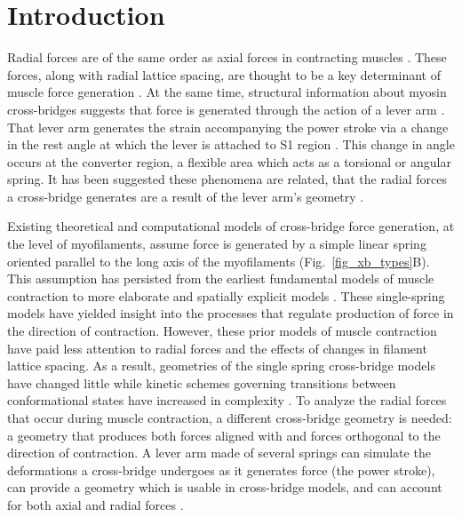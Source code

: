\documentclass[]{article}
\begin{document}

\section*{Introduction} %

Radial forces are of the same order as axial forces in contracting muscles \citep{Cecchi1990, Millman1998}. 
These forces, along with radial lattice spacing, are thought to be a key determinant of muscle force generation \citep{Fuchs2005}. 
At the same time, structural information about myosin cross-bridges suggests that force is generated through the action of a lever arm \citep{Rayment1993, Uyeda1996, Huxley2000}.
That lever arm generates the strain accompanying the power stroke via a change in the rest angle at which the lever is attached to S1 region \citep{Huxley2000, Houdusse2001}. 
This change in angle occurs at the converter region, a flexible area which acts as a torsional or angular spring. 
It has been suggested these phenomena are related, that the radial forces a cross-bridge generates are a result of the lever arm's geometry \citep{Schoenberg1980b}. 

Existing theoretical and computational models of cross-bridge force generation, at the level of myofilaments, assume force is generated by a simple linear spring oriented parallel to the long axis of the myofilaments (Fig.~\ref{fig_xb_types}B).  %
This assumption has persisted from the earliest fundamental models of muscle contraction to more elaborate and spatially explicit models \citep{Huxley1957, Daniel1998, Chase2004, Tanner2007, Campbell2009}.  
These single-spring models have yielded insight into the processes that regulate production of force in the direction of contraction.
However, these prior models of muscle contraction have paid less attention to radial forces and the effects of changes in filament lattice spacing. 
As a result, geometries of the single spring cross-bridge models have changed little while kinetic schemes governing transitions between conformational states have increased in complexity \citep{Huxley1957, Pate1989, Daniel1998, Smith2008a}. %
To analyze the radial forces that occur during muscle contraction, a different cross-bridge geometry is needed: a geometry that produces both forces aligned with and forces orthogonal to the direction of contraction. 
A lever arm made of several springs can simulate the deformations a cross-bridge undergoes as it generates force (the power stroke), can provide a geometry which is usable in cross-bridge models, and can account for both axial and radial forces \citep{Houdusse2001}.  
\end{document}
